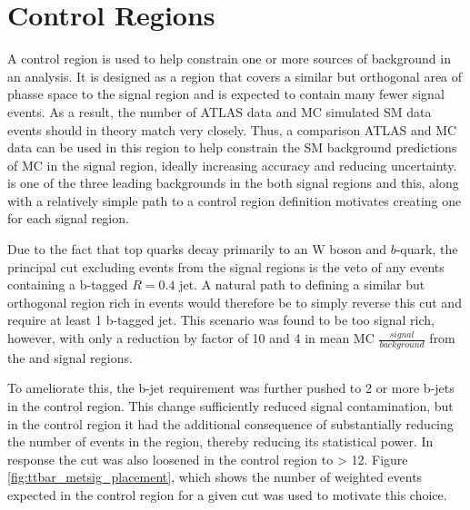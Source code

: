 \section{\ttbar Control Regions}
A control region is used to help constrain one or more sources of background in an analysis. It is designed as a region that covers a similar but orthogonal area of phasse space to the signal region and is expected to contain many fewer signal events. As a result, the number of ATLAS data and MC simulated SM data events should in theory match very closely. Thus, a comparison ATLAS and MC data can be used in this region to help constrain the SM background predictions of MC in the signal region, ideally increasing accuracy and reducing uncertainty. \ttbar is one of the three leading backgrounds in the both signal regions and this, along with a relatively simple path to a control region definition motivates creating one for each signal region.

Due to the fact that top quarks decay primarily to an W boson and $b$-quark, the principal cut excluding \ttbar events from the signal regions is the veto of any events containing a b-tagged \akt $R=0.4$ jet. A natural path to defining a similar but orthogonal region rich in \ttbar events would therefore be to simply reverse this cut and require at least 1 b-tagged jet. This scenario was found to be too signal rich, however, with only a reduction by factor of 10 and 4 in mean MC $\frac{signal}{background}$ from the \merged and \resolved signal regions.

To ameliorate this, the b-jet requirement was further pushed to 2 or more b-jets in the control region. This change sufficiently reduced signal contamination, but in the \merged control region it had the additional consequence of substantially reducing the number of events in the region, thereby reducing its statistical power.  In response the \metsig cut was also loosened in the \merged \ttbar control region to \metsig > 12. Figure \ref{fig:ttbar_metsig_placement}, which shows the number of weighted \ttbar events expected in the \merged control region for a given \metsig cut was used to motivate this choice.

